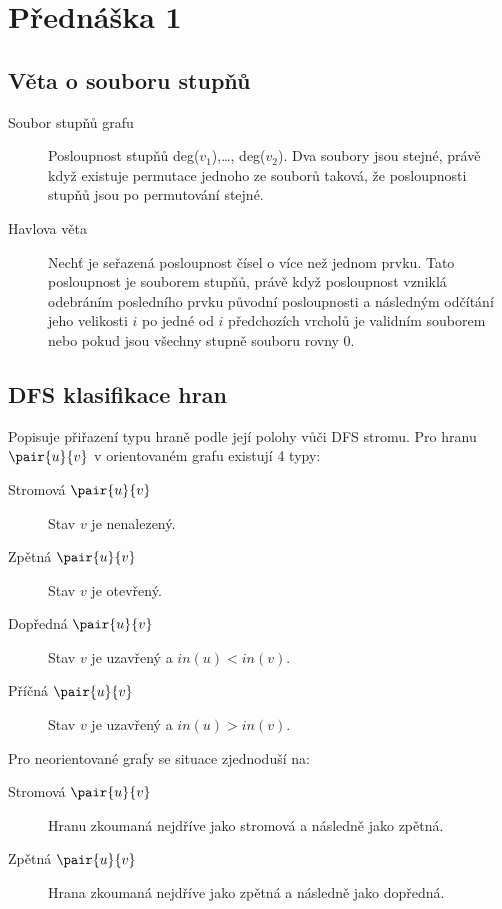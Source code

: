 \section{Přednáška 1}

\subsection{Věta o souboru stupňů}

\begin{description}
    \item[Soubor stupňů grafu] Posloupnost stupňů deg($v_1$),\ldots, deg($v_2$).
    Dva soubory jsou stejné, právě když existuje permutace jednoho ze souborů taková, že posloupnosti stupňů jsou po permutování stejné.
    \item[Havlova věta] Nechť  je seřazená posloupnost čísel o více než jednom prvku.
    Tato posloupnost je souborem stupňů, právě když posloupnost vzniklá odebráním posledního prvku původní posloupnosti a následným odčítání jeho velikosti $i$ po jedné od $i$ předchozích vrcholů je validním souborem nebo pokud jsou všechny stupně souboru rovny $0$.

\end{description}

\subsection{DFS klasifikace hran}
 
 Popisuje přiřazení typu hraně podle její polohy vůči DFS stromu. Pro hranu $\pair{u}{v}$ v orientovaném grafu existují 4 typy:

 \begin{description}
     \item[Stromová $\pair{u}{v}$] Stav $v$ je nenalezený.
     \item[Zpětná $\pair{u}{v}$] Stav $v$ je otevřený.
     \item[Dopředná $\pair{u}{v}$] Stav $v$ je uzavřený a $in(u) < in(v)$.
     \item[Příčná $\pair{u}{v}$] Stav $v$ je uzavřený a $in(u) > in(v)$.
 \end{description}

 Pro neorientované grafy se situace zjednoduší na:

  \begin{description}
     \item[Stromová $\pair{u}{v}$] Hranu zkoumaná nejdříve jako stromová a následně jako zpětná.
     \item[Zpětná $\pair{u}{v}$] Hrana zkoumaná nejdříve jako zpětná a následně jako dopředná.
 \end{description}

